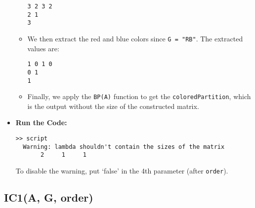 \documentclass[11pt]{amsart}
\theoremstyle{remark}
\theoremstyle{definition}
\theoremstyle{remark}
\numberwithin{equation}{section}
\begin{document}
\begin{itemize}
\begin{itemize}
\begin{verbatim}
3 2 3 2
2 1
3
\end{verbatim}
  \item
    We then extract the red and blue colors since \texttt{G\ =\ "RB"}.
    The extracted values are:

\begin{verbatim}
1 0 1 0
0 1
1
\end{verbatim}
  \item
    Finally, we apply the \texttt{BP(A)} function to get the
    \texttt{coloredPartition}, which is the output without the size of
    the constructed matrix.
  \end{itemize}
\item
  \textbf{Run the Code:}

\begin{verbatim}
>> script
  Warning: lambda shouldn't contain the sizes of the matrix
       2     1     1
\end{verbatim}

  To disable the warning, put `false' in the 4th parameter (after
  \texttt{order}).
\end{itemize}

\subsection{IC1(A, G, order)}\label{ic1a-g-order}
\end{document}
